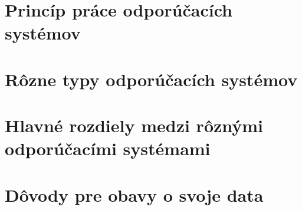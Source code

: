 \documentclass[10pt,twoside,slovak,a4paper]{article}
\begin{document}
\section{Princíp práce odporúčacích systémov}

\section{Rôzne typy odporúčacích systémov}

\section{Hlavné rozdiely medzi rôznými odporúčacími systémami}

\section{Dôvody pre obavy o svoje data}


\end{document}
